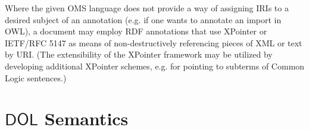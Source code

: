 \documentclass[10pt,fleqn,final]{scrreprt}
\makeatletter
\newcommand{\cbs}[0]{\color{red}\xspace} %
\newcommand{\cbe}[0]{\color{black}\xspace} %
\newcommand*{\eg}{e.g.\@\xspace}
\newcommand*{\CL}{\ensuremath{\mathsf{CL}}\xspace}
\newcommand*{\DOL}{\ensuremath{\mathsf{DOL}}\xspace}
\newcommand{\clause}[1]{\chapter{#1}}
\newcommand{\nisref}[1]{#1}
\newenvironment{definitions}[0]{\medskip }{}
\makeatother
\begin{document}
\begin{definitions}
Where the given OMS language does not provide a way of assigning IRIs to a desired subject of an annotation (\eg if one wants to annotate an import in OWL), a document may employ RDF annotations that use XPointer or \nisref{IETF/RFC 5147} as means of non-destructively referencing pieces of XML or text by URI. {\cbs (The extensibility of the XPointer framework may be utilized by developing additional XPointer schemes, \eg for pointing to subterms of Common Logic sentences.)\cbe}

\clause{\DOL Semantics}\label{c:semantics}

%
%



\end{definitions}
\end{document}
